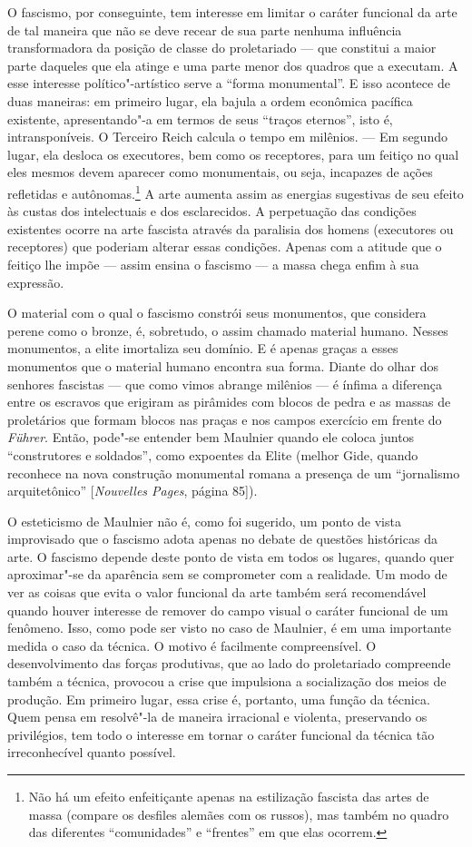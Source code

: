 O fascismo, por conseguinte, tem interesse ​​em limitar o caráter
funcional da arte de tal maneira que não se deve recear de sua parte
nenhuma influência transformadora da posição de classe do proletariado
--- que constitui a maior parte daqueles que ela atinge e uma parte menor
dos quadros que a executam. A esse interesse político"-artístico serve a
``forma monumental''. E isso acontece de duas maneiras: em primeiro
lugar, ela bajula a ordem econômica pacífica existente, apresentando"-a
em termos de seus ``traços eternos'', isto é, intransponíveis. O
Terceiro Reich calcula o tempo em milênios. --- Em segundo lugar, ela
desloca os executores, bem como os receptores, para um feitiço
no qual eles mesmos devem aparecer como monumentais, ou
seja, incapazes de ações refletidas e autônomas.\footnote{Não há
  um efeito enfeitiçante apenas na estilização fascista das artes de
  massa (compare os desfiles alemães com os russos), mas também no
  quadro das diferentes ``comunidades'' e ``frentes'' em que elas
  ocorrem. \versal{[N. A.]}} A arte aumenta assim as energias sugestivas de seu efeito às
custas dos intelectuais e dos esclarecidos. A perpetuação das condições
existentes ocorre na arte fascista através da paralisia dos homens
(executores ou receptores) que poderiam alterar essas condições. Apenas
com a atitude que o feitiço lhe impõe --- assim ensina o fascismo --- a
massa chega enfim à sua expressão.

O material com o qual o fascismo constrói seus monumentos, que considera
perene como o bronze, é, sobretudo, o assim chamado material humano.
Nesses monumentos, a elite imortaliza seu domínio. E é apenas graças a
esses monumentos que o material humano encontra sua forma. Diante do
olhar dos senhores fascistas --- que como vimos abrange milênios --- é
ínfima a diferença entre os escravos que erigiram as pirâmides com
blocos de pedra e as massas de proletários que formam blocos nas praças
e nos campos exercício em frente do \emph{Führer}. Então, pode"-se
entender bem Maulnier quando ele coloca juntos ``construtores e
soldados'', como expoentes da Elite (melhor Gide, quando reconhece na
nova construção monumental romana a presença de um ``jornalismo
arquitetônico'' {[}\emph{Nouvelles Pages}, página 85{]}).

O esteticismo de Maulnier não é, como foi sugerido, um ponto de vista
improvisado que o fascismo adota apenas no debate de questões históricas
da arte. O fascismo depende deste ponto de vista em todos os lugares,
quando quer aproximar"-se da aparência sem se comprometer com a
realidade. Um modo de ver as coisas que evita o valor funcional da arte
também será recomendável quando houver interesse de remover do campo
visual o caráter funcional de um fenômeno. Isso, como pode ser visto no
caso de Maulnier, é em uma importante medida o caso da técnica. O motivo
é facilmente compreensível. O desenvolvimento das forças produtivas, que
ao lado do proletariado compreende também a técnica, provocou a crise
que impulsiona a socialização dos meios de produção. Em primeiro lugar,
essa crise é, portanto, uma função da técnica. Quem pensa em resolvê"-la
de maneira irracional e violenta, preservando os privilégios, tem todo o
interesse em tornar o caráter funcional da técnica tão irreconhecível
quanto possível.

